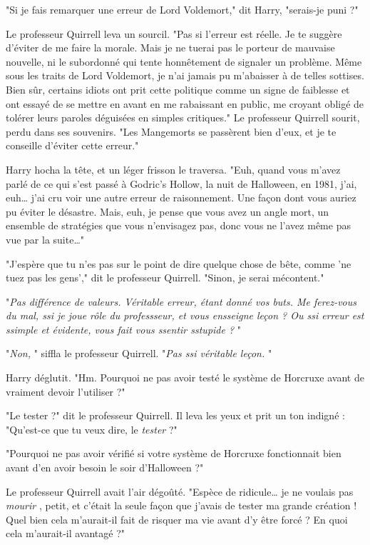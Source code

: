 "Si je fais remarquer une erreur de Lord Voldemort," dit Harry, "serais-je puni ?"

Le professeur Quirrell leva un sourcil. "Pas si l'erreur est réelle. Je te suggère d'éviter de me faire la morale. Mais je ne tuerai pas le porteur de mauvaise nouvelle, ni le subordonné qui tente honnêtement de signaler un problème. Même sous les traits de Lord Voldemort, je n'ai jamais pu m'abaisser à de telles sottises. Bien sûr, certains idiots ont prit cette politique comme un signe de faiblesse et ont essayé de se mettre en avant en me rabaissant en public, me croyant obligé de tolérer leurs paroles déguisées en simples critiques." Le professeur Quirrell sourit, perdu dans ses souvenirs. "Les Mangemorts se passèrent bien d'eux, et je te conseille d'éviter cette erreur."

Harry hocha la tête, et un léger frisson le traversa. "Euh, quand vous m'avez parlé de ce qui s'est passé à Godric's Hollow, la nuit de Halloween, en 1981, j'ai, euh… j'ai cru voir une autre erreur de raisonnement. Une façon dont vous auriez pu éviter le désastre. Mais, euh, je pense que vous avez un angle mort, un ensemble de stratégies que vous n'envisagez pas, donc vous ne l'avez même pas vue par la suite…"

"J'espère que tu n'es pas sur le point de dire quelque chose de bête, comme 'ne tuez pas les gens'," dit le professeur Quirrell. "Sinon, je serai mécontent."

"\emph{Pas différence de valeurs. Véritable erreur, étant donné vos buts. Me ferez-vous du mal, ssi je joue rôle du professseur, et vous ensseigne leçon ? Ou ssi erreur est ssimple et évidente, vous fait vous ssentir sstupide ?} "

"\emph{Non,} " siffla le professeur Quirrell. "\emph{Pas ssi véritable leçon.} "

Harry déglutit. "Hm. Pourquoi ne pas avoir testé le système de Horcruxe avant de vraiment devoir l'utiliser ?"

"Le tester ?" dit le professeur Quirrell. Il leva les yeux et prit un ton indigné : "Qu'est-ce que tu veux dire, le \emph{tester}  ?"

"Pourquoi ne pas avoir vérifié si votre système de Horcruxe fonctionnait bien avant d'en avoir besoin le soir d'Halloween ?"

Le professeur Quirrell avait l'air dégoûté. "Espèce de ridicule… je ne voulais pas \emph{mourir} , petit, et c'était la seule façon que j'avais de tester ma grande création ! Quel bien cela m'aurait-il fait de risquer ma vie avant d'y être forcé ? En quoi cela m'aurait-il avantagé ?"

